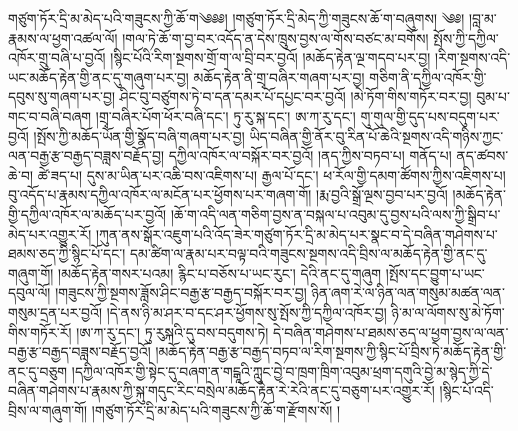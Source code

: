 \setcounter{footnote}{0} 
གཙུག་ཏོར་དྲི་མ་མེད་པའི་གཟུངས་ཀྱི་ཆོ་ག༄༅༅། །གཙུག་ཏོར་དྲི་མེད་ཀྱི་གཟུངས་ཆོ་ག་བཞུགས། ༄༅། །བླ་མ་རྣམས་ལ་ཕྱག་འཚལ་ལོ། །གལ་ཏེ་ཆོ་ག་བྱ་བར་འདོད་ན་དེས་ཁྲུས་བྱས་ལ་གོས་བཙང་མ་བགོས། སྤོས་ཀྱི་དཀྱིལ་འཁོར་གྲུ་བཞི་པ་བྱའོ། །སྙིང་པོའི་རིག་སྔགས་གྲོ་ག་ལ་བྲི་བར་བྱའོ། །མཆོད་རྟེན་ལྔ་གདབ་པར་བྱ། །རིག་སྔགས་འདི་ཡང་མཆོད་རྟེན་གྱི་ནང་དུ་གཞུག་པར་བྱ། མཆོད་རྟེན་ནི་གྲྭ་བཞིར་གཞག་པར་བྱ། གཅིག་ནི་དཀྱིལ་འཁོར་གྱི་དབུས་སུ་གཞག་པར་བྱ། ཤིང་བུ་བཙུགས་ཏེ་བ་དན་དམར་པོ་དཔྱང་བར་བྱའོ། །མེ་ཏོག་གིས་གཏོར་བར་བྱ། བུམ་པ་གང་བ་བཞི་བཞག །གྲྭ་བཞིར་པོག་ཕོར་བཞི་དང་། ཏུ་རུ་སྐ་དང་། ཨ་ཀ་རུ་དང་། གུ་གུལ་གྱི་དུད་པས་བདུག་པར་བྱའོ། །སྤོས་ཀྱི་མཆོད་ཡོན་གྱི་སྣོད་བཞི་གཞག་པར་བྱ། ཡིད་བཞིན་གྱི་ནོར་བུ་རིན་པོ་ཆེའི་སྔགས་འདི་གཉིས་ཀྱང་ལན་བརྒྱ་རྩ་བརྒྱད་བཟླས་བརྗོད་བྱ། དཀྱིལ་འཁོར་ལ་བསྐོར་བར་བྱའོ། །ནད་ཀྱིས་བཏབ་པ། གནོད་པ། ནད་ཚབས་ཆེ་བ། ཚེ་ཟད་པ། དུས་མ་ཡིན་པར་འཆི་བས་འཇིགས་པ། རྒྱལ་པོ་དང་། ཕ་རོལ་གྱི་དམག་ཚོགས་ཀྱིས་འཇིགས་པ། བུ་འདོད་པ་རྣམས་དཀྱིལ་འཁོར་ལ་མངོན་པར་ཕྱོགས་པར་གཞག་གོ། །རྨ་བྱའི་སྒྲོ་ལྔས་བྱབ་པར་བྱའོ། །མཆོད་རྟེན་གྱི་དཀྱིལ་འཁོར་ལ་མཆོད་པར་བྱའོ། །ཆོ་ག་འདི་ལན་གཅིག་བྱས་ན་བསྐལ་པ་འབུམ་དུ་བྱས་པའི་ལས་ཀྱི་སྒྲིབ་པ་མེད་པར་འགྱུར་རོ། །ཀུན་ནས་སྒོར་འཇུག་པའི་འོད་ཟེར་གཙུག་ཏོར་དྲི་མ་མེད་པར་སྣང་བ་དེ་བཞིན་གཤེགས་པ་ཐམས་ཅད་ཀྱི་སྙིང་པོ་དང་། དམ་ཚིག་ལ་རྣམ་པར་བལྟ་བའི་གཟུངས་སྔགས་འདི་བྲིས་ལ་མཆོད་རྟེན་གྱི་ནང་དུ་གཞུག་གོ། །མཆོད་རྟེན་གསར་པའམ། རྙིང་པ་བཅོས་པ་ཡང་རུང་། དེའི་ནང་དུ་གཞུག །སྤོས་དང་བྱུག་པ་ཡང་དབུལ་ལོ། །གཟུངས་ཀྱི་སྔགས་ཟློས་ཤིང་བརྒྱ་རྩ་བརྒྱད་བསྐོར་བར་བྱ། ཉིན་ཞག་རེ་ལ་ཉིན་ལན་གསུམ་མཚན་ལན་གསུམ་དྲན་པར་བྱའོ། །དེ་ནས་ཉི་མ་ཤར་བ་དང་ཤར་ཕྱོགས་སུ་སྤོས་ཀྱི་དཀྱིལ་འཁོར་བྱ། ཉི་མ་ལ་ལོགས་སུ་མེ་ཏོག་གིས་གཏོར་རོ། །ཨ་ཀ་རུ་དང་། ཏུ་རུསྐའི་དུ་བས་བདུགས་ཏེ། དེ་བཞིན་གཤེགས་པ་ཐམས་ཅད་ལ་ཕྱག་བྱས་ལ་ལན་བརྒྱ་རྩ་བརྒྱད་བཟླས་བརྗོད་བྱའོ། །མཆོད་རྟེན་བརྒྱ་རྩ་བརྒྱད་བཏབ་ལ་རིག་སྔགས་ཀྱི་སྙིང་པོ་བྲིས་ཏེ་མཆོད་རྟེན་གྱི་ནང་དུ་བཅུག །དཀྱིལ་འཁོར་གྱི་སྟེང་དུ་བཞག་ན་གངྒཱའི་ཀླུང་བྱེ་བ་ཁྲག་ཁྲིག་འབུམ་ཕྲག་དགུའི་བྱེ་མ་སྙེད་ཀྱི་དེ་བཞིན་གཤེགས་པ་རྣམས་ཀྱི་སྐུ་གདུང་རིང་བསྲེལ་མཆོད་རྟེན་རེ་རེའི་ནང་དུ་བཅུག་པར་འགྱུར་རོ། །སྙིང་པོ་འདི་བྲིས་ལ་གཞུག་གོ། །གཙུག་ཏོར་དྲི་མ་མེད་པའི་གཟུངས་ཀྱི་ཆོ་ག་རྫོགས་སོ། །